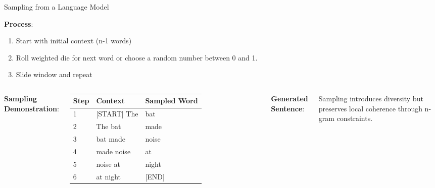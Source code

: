 \documentclass[aspectratio=169,xcolor=dvipsnames,svgnames,x11names,fleqn]{beamer}
\begin{document}
\begin{frame}{Sampling from a Language Model}
\footnotesize

\textbf{Process}:
\begin{enumerate}
\item Start with initial context (n-1 words)
\item Roll weighted die for next word or choose a random number between 0 and 1.
\item Slide window and repeat
\end{enumerate}

\begin{columns}[T]
\textbf{Sampling Demonstration}:
\begin{tabular}{lll}
Step & Context & Sampled Word \\
\hline
1 & [START] The & bat \\
2 & The bat & made \\
3 & bat made & noise \\
4 & made noise & at \\
5 & noise at & night \\
6 & at night & [END] \\
\end{tabular}

\textbf{Generated Sentence}:


Sampling introduces diversity but preserves local coherence through n-gram constraints.

\end{columns}

\end{frame}
\end{document}

